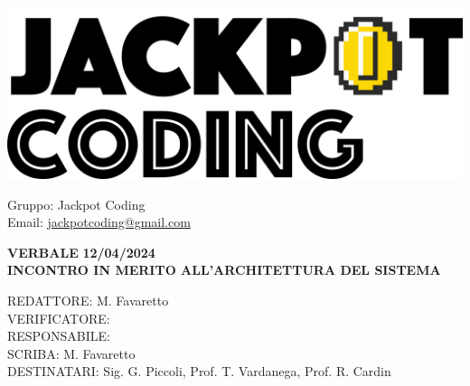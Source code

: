 \documentclass[5pt]{article}
\begin{document}
\begin{minipage}[t]{0.50\textwidth}
    \begin{flushleft}
        \hspace{10pt}
        \includegraphics[scale=0.65]{jackpot-logo.png} 
    \end{flushleft}
\end{minipage}
\hspace{-60pt} %
\begin{flushright}
    \begin{minipage}[t]{0.50\textwidth}
        \begin{flushright}
            Gruppo: {\Large Jackpot Coding}\\
            Email: \href{mailto:jackpotcoding@gmail.com}{jackpotcoding@gmail.com}
        \end{flushright}
    \end{minipage}
\end{flushright}

\vspace{20pt}

\begin{center}
    \textbf{\large VERBALE }
    \textbf{\large 12/04/2024} \\
    \textbf{\LARGE INCONTRO IN MERITO ALL'ARCHITETTURA DEL SISTEMA}
\end{center}

\vspace{13pt}

\begin{flushleft}
    \begin{spacing}{1.5}
        REDATTORE: M. Favaretto\\ 
        VERIFICATORE: \\ 
        RESPONSABILE: \\ 
        \vspace{7pt}
        SCRIBA: M. Favaretto\\ 
        \vspace{7pt}
        DESTINATARI: Sig. G. Piccoli, Prof. T. Vardanega, Prof. R. Cardin\\ 
    \end{spacing}
\end{flushleft}
\end{document}
